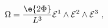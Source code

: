 \begin{equation}
\label{form3}
  \Omega = \frac{\e{2\Phi}}{L^3} 
  \mathcal{E}^1 \wedge \mathcal{E}^2 \wedge \mathcal{E}^3~,
\end{equation}

